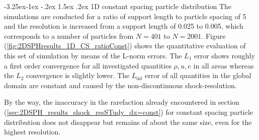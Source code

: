 \documentclass[11pt,a4paper,twoside]{report}
\makeatletter
\renewcommand\paragraph{\@startsection{paragraph}{4}{\z@}%
  {-3.25ex\@plus -1ex \@minus -.2ex}%
  {1.5ex \@plus .2ex}%
  {\normalfont\normalsize\bfseries}}
\makeatother
\begin{document}
\paragraph{1D constant spacing particle distribution}
The simulations are conducted for a ratio of support length to particle spacing of 5 and the resolution is increased from a support length of 0.025 to 0.005, which corresponds to a number of particles from $N=401$ to $N=2001$. 
Figure (\ref{fig:2DSPHresults_1D_CS_ratioConst}) shows the quantitative evaluation of this set of simulation by means of the L-norm errors. The $L_1$ error shows roughly a first order convergence for all investigated quantities $\rho, u, e$ in all areas whereas the $L_2$ convergence is slightly lower.
The $L_{\inf}$ error of all quantities in the global domain are constant and caused by the non-discontinuous shock-resolution.

By the way, the inaccuracy in the rarefaction already encountered in section (\ref{sec:2DSPH_results_shock_resSTudy_dx=const}) for constant spacing particle distribution does not disappear but remains of about the same size, even for the highest resolution. 

\end{document}
